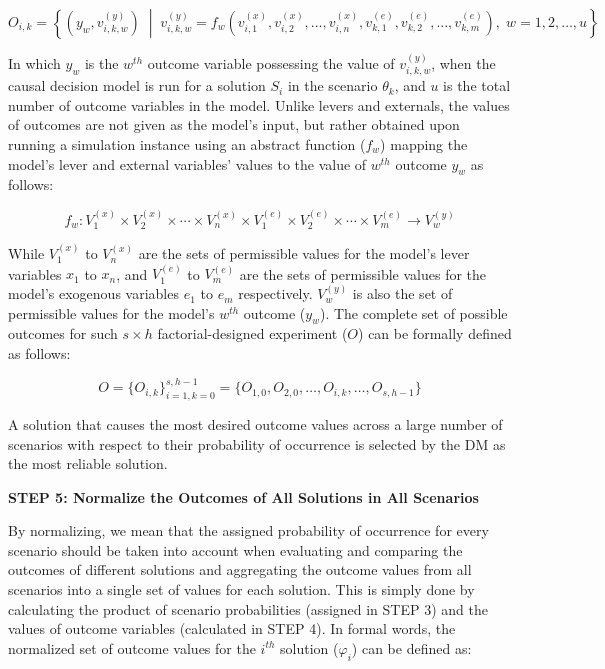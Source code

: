 \documentclass{sfuthesis}
\begin{document}
\begin{equation}
O_{i,k}
=
\left\{
(y_w,v_{i,k,w}^{(y)})
\;\middle|\;
v_{i,k,w}^{(y)}
=
f_w
\!\left(
v_{i,1}^{(x)},
v_{i,2}^{(x)},
\ldots,
v_{i,n}^{(x)},
v_{k,1}^{(e)},
v_{k,2}^{(e)},
\ldots,
v_{k,m}^{(e)}
\right),
\;
w=1,2,\ldots,u
\right\}
\end{equation}

In which $y_w$ is the $w^{th}$ outcome variable possessing the value of $v_{i,k,w}^{(y)}$, when the causal decision model is run for a solution $S_i$ in the scenario $\theta_k$, and $u$ is the total number of outcome variables
in the model. Unlike levers and externals, the values of outcomes are not given as the model’s input, but rather obtained upon running a simulation instance using an abstract function ($f_w$)
mapping the model’s lever and external variables’ values to the value of $w^{th}$ outcome $y_w$ as follows:

\begin{equation}
f_w:
V_1^{(x)}\times V_2^{(x)}\times\cdots\times V_n^{(x)}
\times
V_1^{(e)}\times V_2^{(e)}\times\cdots\times V_m^{(e)}
\rightarrow
V_w^{(y)}
\end{equation}

While $V_1^{(x)}$ to $V_n^{(x)}$ are the sets of permissible values for the model’s lever variables $x_1$ to $x_n$, and $V_1^{(e)}$ to $V_m^{(e)}$ are the sets of permissible values for the model’s exogenous variables $e_1$ to $e_m$ respectively. $V_w^{(y)}$ is also the set of permissible values for the model’s $w^{th}$ outcome ($y_w$). The complete set of possible outcomes for such $s\times h$ factorial-designed experiment ($O$) can be formally defined as follows:

\begin{equation}
O
=
\{O_{i,k}\}_{i=1,k=0}^{s,h-1}
=
\{O_{1,0},O_{2,0},\ldots,O_{i,k},\ldots,O_{s,h-1}\}
\end{equation}

A solution that causes the most desired outcome values across a large number of scenarios with respect to their probability of occurrence is selected by the DM as the most reliable solution.

\textbf{STEP 5: Normalize the Outcomes of All Solutions in All Scenarios}

By normalizing, we mean that the assigned probability of occurrence for every scenario should be taken into account when evaluating and comparing the outcomes of different solutions and aggregating the outcome values from all scenarios into a single set of values for each solution. This is simply done by calculating the product of scenario probabilities (assigned in STEP 3) and the values of outcome variables (calculated in STEP 4). In formal words, the normalized set of outcome values for the $i^{th}$ solution ($\varphi_i$) can be defined as:
\end{document}

